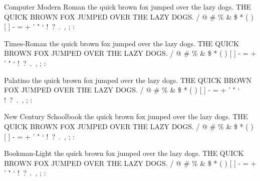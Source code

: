 \documentclass{article}
\begin{document}
{\selectfont
Computer Modern Roman \newline
the quick brown fox jumped over the lazy dogs. \newline
THE QUICK BROWN FOX JUMPED OVER THE LAZY DOGS.  / @ \# \% \& \$ * ( ) [ ] - = + ' " ` !\ ?\ .\ , ; : }
\par
{\selectfont
Times-Roman \newline
the quick brown fox jumped over the lazy dogs. \newline
THE QUICK BROWN FOX JUMPED OVER THE LAZY DOGS.  / @ \# \% \& \$ * ( ) [ ] - = + ' " ` !\ ?\ .\ , ; : }
\par
{\selectfont
Palatino \newline
the quick brown fox jumped over the lazy dogs. \newline
THE QUICK BROWN FOX JUMPED OVER THE LAZY DOGS.  / @ \# \% \& \$ * ( ) [ ] - = + ' " ` !\ ?\ .\ , ; : }
\par
{\selectfont
New Century Schoolbook \newline
the quick brown fox jumped over the lazy dogs. \newline
THE QUICK BROWN FOX JUMPED OVER THE LAZY DOGS.  / @ \# \% \& \$ * ( ) [ ] - = + ' " ` !\ ?\ .\ , ; : }
\par
{\selectfont
Bookman-Light \newline
the quick brown fox jumped over the lazy dogs. \newline
THE QUICK BROWN FOX JUMPED OVER THE LAZY DOGS.  / @ \# \% \& \$ * ( ) [ ] - = + ' " ` !\ ?\ .\ , ; : }
\end{document}

